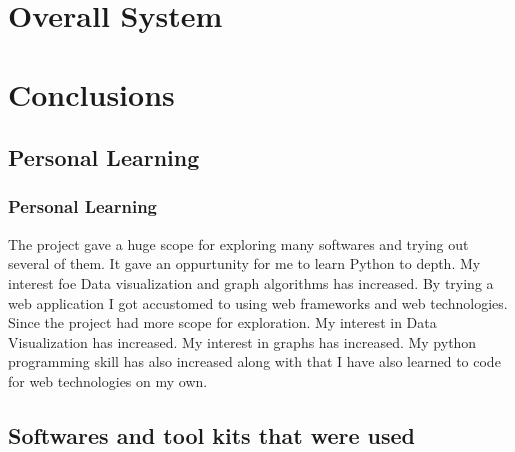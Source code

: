 \documentclass{beamer}
\begin{document}
\section{Overall System}

\section{Conclusions}

\subsection{Personal Learning}
\frame
{
	\frametitle{Personal Learning}
The project gave a huge scope for exploring many softwares and trying out several of them. It gave an oppurtunity for me to learn Python to depth. My interest foe Data visualization and graph algorithms has increased. By trying a web application I got accustomed to using web frameworks and web technologies. 
Since the project had more scope for exploration.
My interest in Data Visualization has increased.
My interest in graphs has increased.
My python programming skill has also increased along with that I have also learned to code for web technologies on my own.
}

\subsection{Softwares and tool kits that were used}
\end{document}
